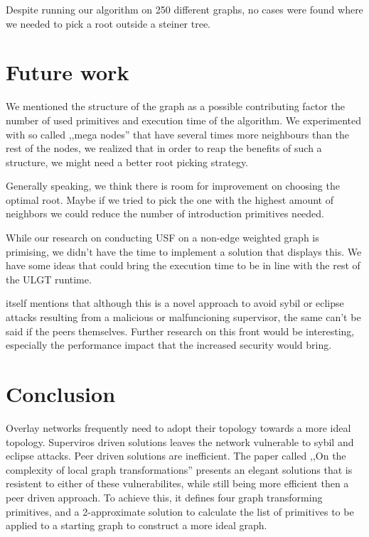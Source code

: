 \documentclass{article}
\begin{document}
Despite running our algorithm on 250 different graphs, no cases were found where we needed to pick a root outside a steiner tree.

\section{Future work}
\label{sec:future-work}

We mentioned the structure of the graph as a possible contributing factor the number of used primitives and execution time of the algorithm. We experimented with so called ,,mega nodes'' that have several times more neighbours than the rest of the nodes, we realized that in order to reap the benefits of such a structure, we might need a better root picking strategy.

Generally speaking, we think there is room for improvement on choosing the optimal root. Maybe if we tried to pick the one with the highest amount of neighbors we could reduce the number of introduction primitives needed.

While our research on conducting USF on a non-edge weighted graph is primising, we didn't have the time to implement a solution that displays this. We have some ideas that could bring the execution time to be in line with the rest of the ULGT runtime.

\cite{ulgt} itself mentions that although this is a novel approach to avoid sybil or eclipse attacks resulting from a malicious or malfuncioning supervisor, the same can't be said if the peers themselves. Further research on this front would be interesting, especially the performance impact that the increased security would bring.

\section{Conclusion}

Overlay networks frequently need to adopt their topology towards a more ideal topology. Superviros driven solutions leaves the network vulnerable to sybil and eclipse attacks. Peer driven solutions are inefficient. The paper called ,,On the complexity of local graph transformations'' presents an elegant solutions that is resistent to either of these vulnerabilites, while still being more efficient then a peer driven approach. To achieve this, it defines four graph transforming primitives, and a 2-approximate solution to calculate the list of primitives to be applied to a starting graph to construct a more ideal graph.
\end{document}
